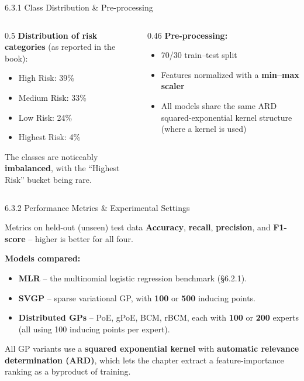 \documentclass[aspectratio=169,10pt]{beamer}
\begin{document}
\begin{frame}{6.3.1 Class Distribution \& Pre-processing}
  \begin{columns}[T]
    \begin{column}{0.5\textwidth}
      \textbf{Distribution of risk categories} (as reported in the book):
      \begin{itemize}
        \item High Risk: 39\%
        \item Medium Risk: 33\%
        \item Low Risk: 24\%
        \item Highest Risk: 4\%
      \end{itemize}
      \vspace{0.3em}
      The classes are noticeably \textbf{imbalanced}, with the ``Highest
      Risk'' bucket being rare.
    \end{column}
    \begin{column}{0.46\textwidth}
      \textbf{Pre-processing:}
      \begin{itemize}
        \item 70/30 train--test split
        \item Features normalized with a \textbf{min--max scaler}
        \item All models share the same ARD squared-exponential kernel
              structure (where a kernel is used)
      \end{itemize}
    \end{column}
  \end{columns}
\end{frame}

\begin{frame}{6.3.2 Performance Metrics \& Experimental Settings}
  \begin{block}{Metrics on held-out (unseen) test data}
    \textbf{Accuracy}, \textbf{recall}, \textbf{precision}, and
    \textbf{F1-score} -- higher is better for all four.
  \end{block}
  \textbf{Models compared:}
  \begin{itemize}
    \item \textbf{MLR} -- the multinomial logistic regression benchmark
          (\S6.2.1).
    \item \textbf{SVGP} -- sparse variational GP, with \textbf{100} or
          \textbf{500} inducing points.
    \item \textbf{Distributed GPs} -- PoE, gPoE, BCM, rBCM, each with
          \textbf{100} or \textbf{200} experts (all using 100 inducing
          points per expert).
  \end{itemize}
  \vspace{0.2em}
  All GP variants use a \textbf{squared exponential kernel} with
  \textbf{automatic relevance determination (ARD)}, which lets the chapter
  extract a feature-importance ranking as a byproduct of training.
\end{frame}
\end{document}
